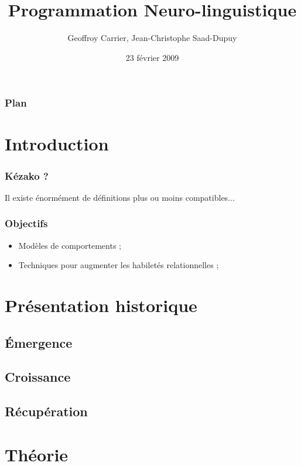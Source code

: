\documentclass{beamer}
\title{Programmation Neuro-linguistique}
\author{Geoffroy Carrier, Jean-Christophe Saad-Dupuy}
\institute{Université Joseph Fourier, L3 MIAGE}
\date{23 février 2009}
\begin{document}
\frame{\titlepage}

\begin{frame}
\frametitle{Plan}
\tableofcontents
\end{frame}

\section{Introduction} %
\label{sec:introduction}
\begin{frame}[t]\frametitle{Kézako ?}
	Il existe énormément de définitions plus ou moins compatibles...
	\begin{cite}
		
	\end{cite}
\end{frame}

\begin{frame}[t]\frametitle{Objectifs}
	\begin{itemize}
		\item<+-> Modèles de comportements ;
		\item<+-> Techniques pour augmenter les habiletés relationnelles ;
	\end{itemize}
\end{frame}


\section{Présentation historique}
\subsection{Émergence}
\subsection{Croissance}
\subsection{Récupération}

\section{Théorie}
\end{document}
